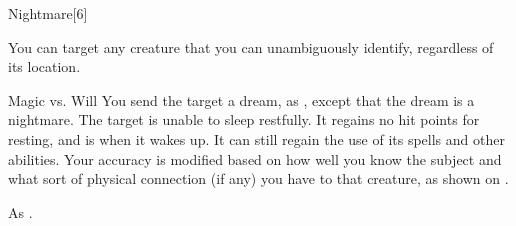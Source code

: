 \begin{spellsection}{Nightmare}[6]
    \begin{spellheader}
    \end{spellheader}
    \begin{spellcontent}
        \begin{spelltargetinginfo}
        \end{spelltargetinginfo}
        \begin{spelleffects}

            \spellspecial You can target any creature that you can unambiguously identify, regardless of its location.
            \begin{spellattack}{Magic vs. Will}
                \spelleffect You send the target a dream, as , except that the dream is a nightmare.
                \spellsuccess The target is unable to sleep restfully. It regains no hit points for resting, and is \fatigued when it wakes up. It can still regain the use of its spells and other abilities.
                \spellspecial Your accuracy is modified based on how well you know the subject and what sort of physical connection (if any) you have to that creature, as shown on .
            \end{spellattack}
        \end{spelleffects}
    \end{spellcontent}
    \begin{spellfooter}
        \spellnotes As .
    \end{spellfooter}
\end{spellsection}

